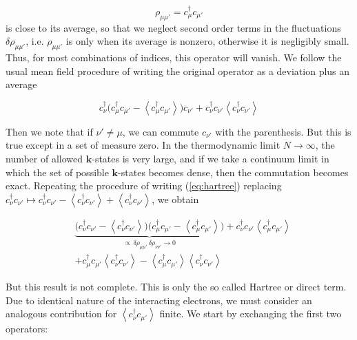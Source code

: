 \begin{equation}
\rho_{\mu\mu'} = c_{\mu}^\dagger c_{\mu'}
\end{equation}
is close to its average, so that we neglect second order terms in the fluctuations $\delta \rho_{\mu\mu'}$, i.e. $\rho_{\mu\mu'}$ is  only when its average is nonzero, otherwise it is negligibly small. Thus, for most combinations of indices, this operator will vanish. We follow the usual mean field procedure of writing the original operator as a deviation plus an average

\begin{equation}\label{eq:hartree}
c_{\nu}^\dagger \bigg( c_\mu^\dagger c_{\mu'} - \left\langle c_\mu^\dagger c_{\mu'} \right\rangle \bigg) c_{\nu'} + c_{\nu}^\dagger c_{\nu'} \left\langle c_\nu^\dagger c_{\nu'} \right\rangle
\end{equation}

Then we note that if $\nu' \neq \mu$, we can commute $c_{\nu'}$ with the parenthesis. But this is true except in a set of measure zero. In the thermodynamic limit $N \rightarrow \infty$, the number of allowed $\bm k$-states is very large, and if we take a continuum limit in which the set of possible $\bm k$-states becomes dense, then the commutation becomes exact. Repeating the procedure of writing (\ref{eq:hartree}) replacing $c_\nu^\dagger c_{\nu'} \mapsto c_\nu^\dagger c_{\nu'} - \left\langle c_\nu^\dagger c_{\nu'} \right\rangle + \left\langle c_\nu^\dagger c_{\nu'} \right\rangle $, we obtain

\begin{equation}
\begin{split}
&\underbrace{\big( c_\nu^\dagger c_{\nu'} - \left\langle c_\nu^\dagger c_{\nu'} \right\rangle \big) \big( c_\mu^\dagger c_{\mu'} - \left\langle c_\mu^\dagger c_{\mu'} \right\rangle \big)}_{\propto \, \delta \rho_{\mu\mu'} \, \delta \rho_{\nu\nu'} \rightarrow 0} + c_\nu^\dagger c_{\nu'} \left\langle c_\mu^\dagger c_{\mu'} \right\rangle \\
&+ c_\mu^\dagger c_{\mu'} \left\langle c_\nu^\dagger c_{\nu'} \right\rangle - \left\langle c_\mu^\dagger c_{\mu'} \right\rangle \left\langle c_\nu^\dagger c_{\nu'} \right\rangle
\end{split}
\end{equation}

But this result is not complete. This is only the so called Hartree or direct term. Due to identical nature of the interacting electrons, we must consider an analogous contribution for $\left\langle c_\nu^\dagger c_{\mu'} \right\rangle$ finite. We start by exchanging the first two operators: 

